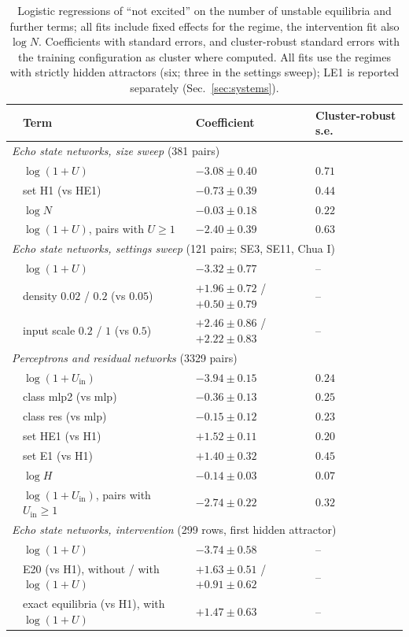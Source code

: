 \documentclass[aip,cha,reprint,amsmath,amssymb,longbibliography]{revtex4-2}
\theoremstyle{definition}
\begin{document}
\begin{table}
\caption{Logistic regressions of ``not excited'' on the number of unstable equilibria and further terms; all fits include
fixed effects for the regime, the intervention fit also $\log N$. Coefficients with standard errors, and cluster-robust
standard errors with the training configuration as cluster where computed. All fits use the regimes with strictly hidden
attractors (six; three in the settings sweep); LE1 is reported separately (Sec.~\ref{sec:systems}).}
\label{tab:regressions}
\begin{ruledtabular}
\begin{tabular}{llll}
 & Term & Coefficient & Cluster-robust s.e. \\
\hline
\multicolumn{4}{l}{\emph{Echo state networks, size sweep} (381 pairs)} \\
 & $\log(1+U)$ & $-3.08\pm0.40$ & $0.71$ \\
 & set H1 (vs HE1) & $-0.73\pm0.39$ & $0.44$ \\
 & $\log N$ & $-0.03\pm0.18$ & $0.22$ \\
 & $\log(1+U)$, pairs with $U\ge1$ & $-2.40\pm0.39$ & $0.63$ \\
\multicolumn{4}{l}{\emph{Echo state networks, settings sweep} (121 pairs; SE3, SE11, Chua I)} \\
 & $\log(1+U)$ & $-3.32\pm0.77$ & -- \\
 & density $0.02$ / $0.2$ (vs $0.05$) & $+1.96\pm0.72$ / $+0.50\pm0.79$ & -- \\
 & input scale $0.2$ / $1$ (vs $0.5$) & $+2.46\pm0.86$ / $+2.22\pm0.83$ & -- \\
\multicolumn{4}{l}{\emph{Perceptrons and residual networks} (3329 pairs)} \\
 & $\log(1+U_{\mathrm{in}})$ & $-3.94\pm0.15$ & $0.24$ \\
 & class mlp2 (vs mlp) & $-0.36\pm0.13$ & $0.25$ \\
 & class res (vs mlp) & $-0.15\pm0.12$ & $0.23$ \\
 & set HE1 (vs H1) & $+1.52\pm0.11$ & $0.20$ \\
 & set E1 (vs H1) & $+1.40\pm0.32$ & $0.45$ \\
 & $\log H$ & $-0.14\pm0.03$ & $0.07$ \\
 & $\log(1+U_{\mathrm{in}})$, pairs with $U_{\mathrm{in}}\ge1$ & $-2.74\pm0.22$ & $0.32$ \\
\multicolumn{4}{l}{\emph{Echo state networks, intervention} (299 rows, first hidden attractor)} \\
 & $\log(1+U)$ & $-3.74\pm0.58$ & -- \\
 & E20 (vs H1), without / with $\log(1+U)$ & $+1.63\pm0.51$ / $+0.91\pm0.62$ & -- \\
 & exact equilibria (vs H1), with $\log(1+U)$ & $+1.47\pm0.63$ & -- \\
\end{tabular}
\end{ruledtabular}
\end{table}



\clearpage   %

\end{document}
